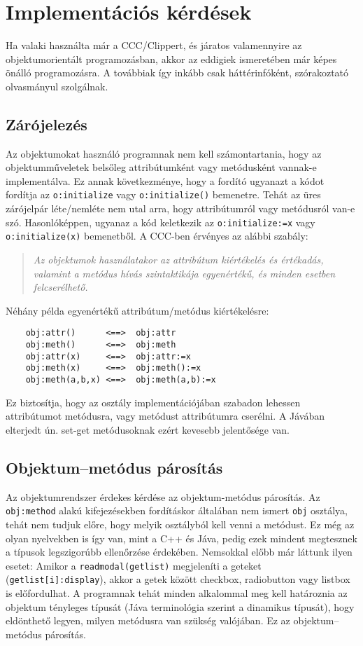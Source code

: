 \section{Implementációs kérdések}
Ha valaki használta már a CCC/Clippert, és járatos valamennyire
az objektumorientált programozásban, akkor az eddigiek ismeretében
már képes önálló programozásra.  A továbbiak így inkább csak 
háttérinfóként, szórakoztató olvasmányul szolgálnak.

\label{zarojel}
\subsection{Zárójelezés}

Az objektumokat használó programnak nem kell számontartania,
hogy az objektumműveletek belsőleg attribútumként vagy metódusként
vannak-e implementálva. Ez annak következménye, hogy a fordító 
ugyanazt a kódot fordítja az \verb!o:initialize! vagy \verb!o:initialize()!
bemenetre. Tehát az üres zárójelpár léte/nemléte nem utal arra,
hogy attribútumról vagy metódusról van-e szó.
Hasonlóképpen, ugyanaz a kód keletkezik az \verb!o:initialize:=x! 
vagy \verb!o:initialize(x)! bemenetből. 
A CCC-ben érvényes az alábbi szabály:
\begin{quote}\em
   Az objektumok használatakor az attribútum kiértékelés és értékadás,
   valamint a metódus hívás szintaktikája egyenértékű, és minden
   esetben felcserélhető.
\end{quote}
Néhány példa egyenértékű attribútum/metódus kiértékelésre:
\begin{verbatim}
    obj:attr()      <==>  obj:attr
    obj:meth()      <==>  obj:meth
    obj:attr(x)     <==>  obj:attr:=x
    obj:meth(x)     <==>  obj:meth():=x
    obj:meth(a,b,x) <==>  obj:meth(a,b):=x
\end{verbatim}
Ez biztosítja,
hogy az osztály implementációjában szabadon lehessen attribútumot metódusra,
vagy metódust attribútumra cserélni. A Jávában elterjedt ún. set-get 
metódusoknak ezért kevesebb jelentősége van.


\subsection{Objektum--metódus párosítás}
Az objektumrendszer érdekes kérdése az objektum-metódus párosítás. 
Az \verb!obj:method! alakú kifejezésekben fordításkor általában nem ismert 
\verb!obj! osztálya, tehát nem tudjuk előre, hogy melyik osztályból kell 
venni a metódust. Ez még az olyan nyelvekben is így van, mint a C++ és Jáva, 
pedig ezek mindent megtesznek a típusok legszigorúbb ellenőrzése érdekében.
Nemsokkal előbb már láttunk ilyen esetet: Amikor a \verb!readmodal(getlist)! 
megjeleníti a geteket (\verb!getlist[i]:display!), akkor a getek között
checkbox, radiobutton vagy listbox is előfordulhat. 
A programnak tehát minden alkalommal meg kell határoznia az 
objektum tényleges típusát (Jáva terminológia szerint
a dinamikus típusát), hogy eldönthető legyen, milyen metódusra
van szükség valójában. Ez az objektum--metódus párosítás.

